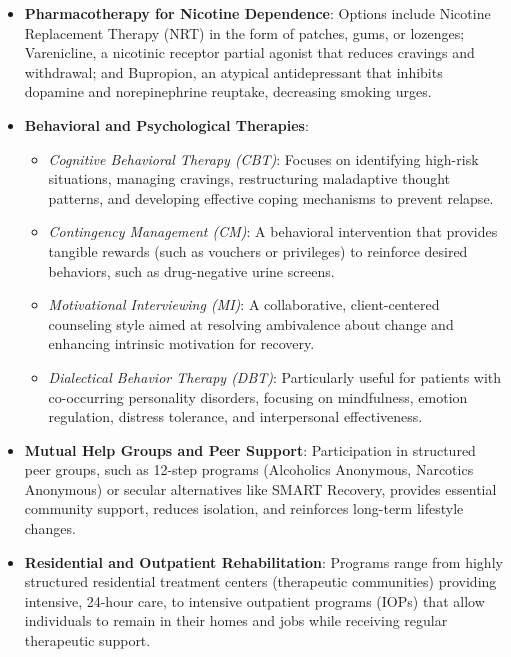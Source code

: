 \begin{itemize}
\begin{itemize}
    \end{itemize}
    \item \textbf{Pharmacotherapy for Nicotine Dependence}: Options include Nicotine Replacement Therapy (NRT) in the form of patches, gums, or lozenges; Varenicline, a nicotinic receptor partial agonist that reduces cravings and withdrawal; and Bupropion, an atypical antidepressant that inhibits dopamine and norepinephrine reuptake, decreasing smoking urges.
    \item \textbf{Behavioral and Psychological Therapies}:
    \begin{itemize}
        \item \textit{Cognitive Behavioral Therapy (CBT)}: Focuses on identifying high-risk situations, managing cravings, restructuring maladaptive thought patterns, and developing effective coping mechanisms to prevent relapse.
        \item \textit{Contingency Management (CM)}: A behavioral intervention that provides tangible rewards (such as vouchers or privileges) to reinforce desired behaviors, such as drug-negative urine screens.
        \item \textit{Motivational Interviewing (MI)}: A collaborative, client-centered counseling style aimed at resolving ambivalence about change and enhancing intrinsic motivation for recovery.
        \item \textit{Dialectical Behavior Therapy (DBT)}: Particularly useful for patients with co-occurring personality disorders, focusing on mindfulness, emotion regulation, distress tolerance, and interpersonal effectiveness.
    \end{itemize}
    \item \textbf{Mutual Help Groups and Peer Support}: Participation in structured peer groups, such as 12-step programs (Alcoholics Anonymous, Narcotics Anonymous) or secular alternatives like SMART Recovery, provides essential community support, reduces isolation, and reinforces long-term lifestyle changes.
    \item \textbf{Residential and Outpatient Rehabilitation}: Programs range from highly structured residential treatment centers (therapeutic communities) providing intensive, 24-hour care, to intensive outpatient programs (IOPs) that allow individuals to remain in their homes and jobs while receiving regular therapeutic support.
\end{itemize}

